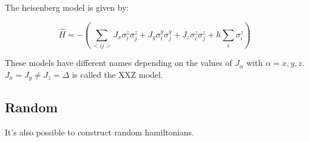 The heisenberg model is given by:

\begin{equation}
    \hat{H} =  -\left( \sum_{<i j>} J_x \sigma^z_i \sigma^z_j + J_y \sigma^y_i \sigma^y_j+ J_z \sigma^z_i \sigma^z_j + h \sum_i \sigma^z_i \right )
\end{equation}

These models have different names depending on the values of $J_{\alpha} $ with $\alpha=x,y,z$. $J_x = J_y \neq J_z = \Delta$ is called the XXZ model.

\subsection{Random}
It's also possible to construct random hamiltonians. 